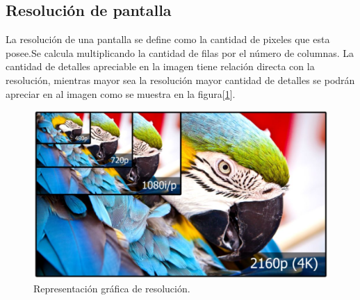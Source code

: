 
\subsection{Resolución de pantalla}
La resolución de una pantalla se define como la cantidad de pixeles que esta posee.Se calcula multiplicando la cantidad de filas por el número de columnas\citep{WIKIRESOL}. La cantidad de detalles apreciable en la imagen tiene relación directa con la resolución, mientras mayor sea la resolución mayor cantidad de detalles se podrán apreciar en al imagen como se muestra en la figura[\ref{fig:grafresolucion}].
\begin{figure}[htpb]
	\centering
	\includegraphics[scale=0.3]{Figures/resolucion.jpg} 
	\caption{Representación gráfica de resolución\protect\footnotemark.}
	\label{fig:grafresolucion}
\end{figure}



